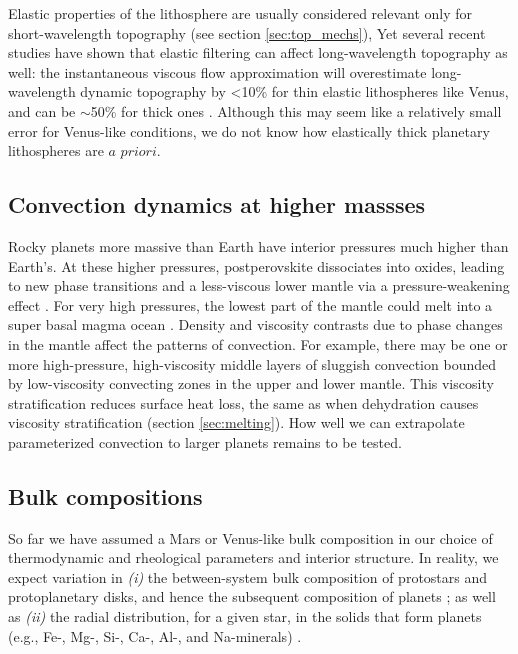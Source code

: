 Elastic properties of the lithosphere are usually considered relevant only for short-wavelength topography (see section \ref{sec:top_mechs}), Yet several recent studies have shown that elastic filtering can affect long-wavelength topography as well: the instantaneous viscous flow approximation will overestimate long-wavelength dynamic topography by \textless10\% for thin elastic lithospheres like Venus, and can be $\sim$50\% for thick ones \citep{Zhong2002, Golle2012, Dumoulin2013}. Although this may seem like a relatively small error for Venus-like conditions, we do not know how elastically thick planetary lithospheres are $\textit{a priori}$.

\subsection{Convection dynamics at higher massses}

Rocky planets more massive than Earth have interior pressures much higher than Earth's. At these higher pressures, postperovskite dissociates into oxides, leading to new phase transitions \citep[up to four, meaning a five-layered mantle;][]{vandenBerg2019} and a less-viscous lower mantle via a pressure-weakening effect \citep{Umemoto2011, Karato2011, Tackley2013, Umemoto2017, Shahnas2018, Ritterbex2018, vandenBerg2019}. For very high pressures, the lowest part of the mantle could melt into a super basal magma ocean \citep{Labrosse2007}. Density and viscosity contrasts due to phase changes in the mantle affect the patterns of convection. For example, there may be one or more high-pressure, high-viscosity middle layers of sluggish convection bounded by low-viscosity convecting zones in the upper and lower mantle. This viscosity stratification reduces surface heat loss, the same as when dehydration causes viscosity stratification (section \ref{sec:melting}). How well we can extrapolate parameterized convection to larger planets remains to be tested. %


\subsection{Bulk compositions} \label{sec:future-exoticplanets}

So far we have assumed a Mars or Venus-like bulk composition in our choice of thermodynamic and rheological parameters and interior structure. In reality, we expect variation in \textit{(i)} the between-system bulk composition of protostars and protoplanetary disks, and hence the subsequent composition of planets \citep{Bitsch2020}; as well as \textit{(ii)} the radial distribution, for a given star, in the solids that form planets (e.g., Fe-, Mg-, Si-, Ca-, Al-, and Na-minerals) \citep{Dorn2019, Miyazaki2020}. 


